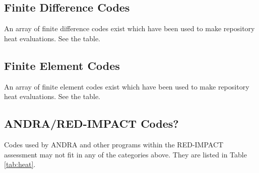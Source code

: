 \subsection{Finite Difference Codes}

An array of finite difference codes exist which have been used to make 
repository heat evaluations. See the table. 

\subsection{Finite Element Codes}

An array of finite element codes exist which have been used to make 
repository heat evaluations. See the table. 

\subsection{ANDRA/RED-IMPACT Codes?}

Codes used by ANDRA and other programs within the RED-IMPACT assessment may not  
fit in any of the categories above. They are listed in Table \ref{tab:heat}.







